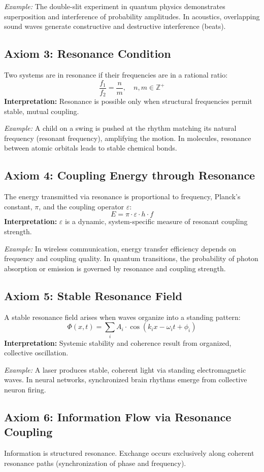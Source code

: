 \documentclass[12pt]{article}
\begin{document}
\textit{Example:} The double-slit experiment in quantum physics demonstrates superposition and interference of probability amplitudes. In acoustics, overlapping sound waves generate constructive and destructive interference (beats).

\subsection{Axiom 3: Resonance Condition}
Two systems are in resonance if their frequencies are in a rational ratio:
\[
\frac{f_1}{f_2} = \frac{n}{m},\quad n, m \in \mathbb{Z}^+
\]
\textbf{Interpretation:} Resonance is possible only when structural frequencies permit stable, mutual coupling.

\textit{Example:} A child on a swing is pushed at the rhythm matching its natural frequency (resonant frequency), amplifying the motion. In molecules, resonance between atomic orbitals leads to stable chemical bonds.

\subsection{Axiom 4: Coupling Energy through Resonance}
The energy transmitted via resonance is proportional to frequency, Planck's constant, $\pi$, and the coupling operator $\varepsilon$:
\[
E = \pi \cdot \varepsilon \cdot h \cdot f
\]
\textbf{Interpretation:} $\varepsilon$ is a dynamic, system-specific measure of resonant coupling strength.

\textit{Example:} In wireless communication, energy transfer efficiency depends on frequency and coupling quality. In quantum transitions, the probability of photon absorption or emission is governed by resonance and coupling strength.

\subsection{Axiom 5: Stable Resonance Field}
A stable resonance field arises when waves organize into a standing pattern:
\[
\Phi(x, t) = \sum_{i} A_i \cdot \cos(k_i x - \omega_i t + \phi_i)
\]
\textbf{Interpretation:} Systemic stability and coherence result from organized, collective oscillation.

\textit{Example:} A laser produces stable, coherent light via standing electromagnetic waves. In neural networks, synchronized brain rhythms emerge from collective neuron firing.

\subsection{Axiom 6: Information Flow via Resonance Coupling}
Information is structured resonance. Exchange occurs exclusively along coherent resonance paths (synchronization of phase and frequency).
\end{document}

